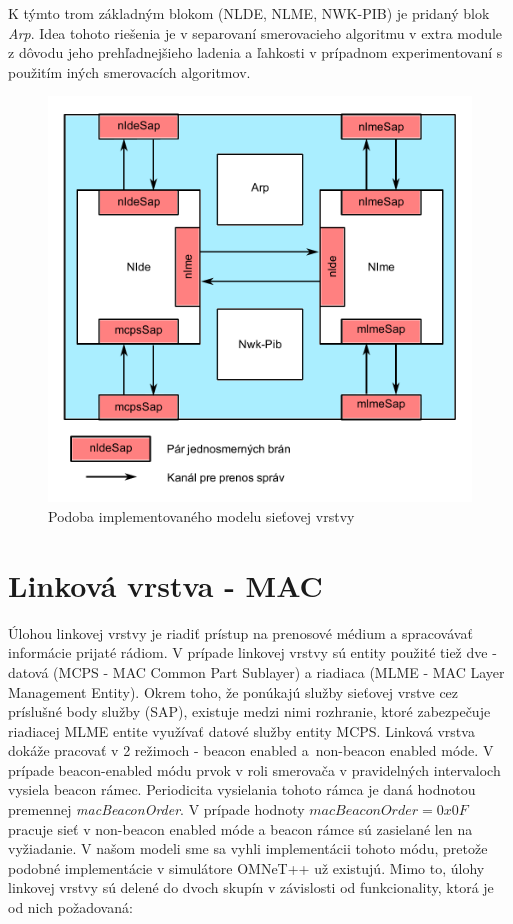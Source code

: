 \indent K týmto trom základným blokom (NLDE, NLME, NWK-PIB) je pridaný blok \textit{Arp}. Idea tohoto riešenia je v separovaní smerovacieho algoritmu v extra module z dôvodu jeho prehľadnejšieho ladenia a ľahkosti v prípadnom experimentovaní s použitím iných smerovacích algoritmov.\\
\begin{figure}[htbp]
\begin{center}
\includegraphics[width=120mm]{figures/architecture_net}
\caption{Podoba implementovaného modelu sieťovej vrstvy}
\label{fig:architecture_net}
\end{center}
\end{figure}

\section{Linková vrstva - MAC}
\indent\indent Úlohou linkovej vrstvy je riadiť prístup na prenosové médium a spracovávať informácie prijaté rádiom. V prípade linkovej vrstvy sú entity použité tiež dve - datová (MCPS - MAC Common Part Sublayer) a riadiaca (MLME - MAC Layer Management Entity). Okrem toho, že ponúkajú služby sieťovej vrstve cez príslušné body služby (SAP), existuje medzi nimi rozhranie, ktoré zabezpečuje riadiacej MLME entite využívať datové služby entity MCPS. Linková vrstva dokáže pracovať v 2 režimoch - beacon enabled a~non-beacon enabled móde. V prípade beacon-enabled módu prvok v roli smerovača v pravidelných intervaloch vysiela beacon rámec. Periodicita vysielania tohoto rámca je daná hodnotou premennej \textit{macBeaconOrder}. V prípade hodnoty $macBeaconOrder = 0x0F$ pracuje sieť v non-beacon enabled móde a beacon rámce sú zasielané len na vyžiadanie. V našom modeli sme sa vyhli implementácii tohoto módu, pretože podobné implementácie v simulátore OMNeT++ už existujú. Mimo to, úlohy linkovej vrstvy sú delené do dvoch skupín v závislosti od funkcionality, ktorá je od nich požadovaná:
